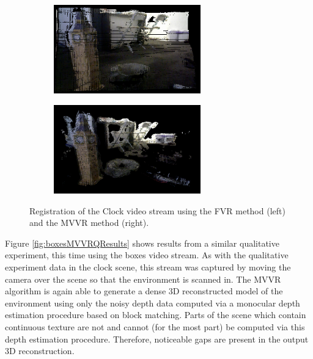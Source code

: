 \begin{figure}[!htb]
        \centering
        \begin{subfigure}[b]{2.8in}
                \includegraphics[width=2.5in]{images/results/mvvr/clockFVR}
                \label{fig:clockFVRRes}
        \end{subfigure}%
        \begin{subfigure}[b]{2.8in}
                \includegraphics[width=2.5in]{images/results/mvvr/clockMVVR}
                \label{fig:clockMVVRRes}
        \end{subfigure}
        \caption{Registration of the Clock video stream using the FVR method (left) and the MVVR method (right).}
       \label{fig:clockMVVRQResults}
\end{figure}

Figure \ref{fig:boxesMVVRQResults} shows results from a similar qualitative experiment, this time using the boxes video stream. As with the qualitative experiment data in the clock scene, this stream was captured by moving the camera over the scene so that the environment is scanned in. The MVVR algorithm is again able to generate a dense 3D reconstructed model of the environment using only the noisy depth data computed via a monocular depth estimation procedure based on block matching. Parts of the scene which contain continuous texture are not and cannot (for the most part) be computed via this depth estimation procedure. Therefore, noticeable gaps are present in the output 3D reconstruction. \\



